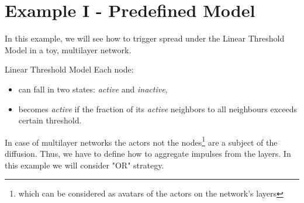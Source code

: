 \documentclass{beamer}
\begin{document}

\section{Example I - Predefined Model}

\begin{frame}{\secname}
    In this example, we will see how to trigger spread under the Linear Threshold Model in a toy,
    multilayer network.
    \begin{block}{Linear Threshold Model}
    Each node:
    \begin{itemize}
        \item can fall in two states: \textit{active} and \textit{inactive},
        \item becomes \textit{active} if the fraction of its \textit{active} neighbors to all neighbours
        exceeds certain threshold.
    \end{itemize}
    \end{block}
    In case of multilayer networks the actors not the nodes\footnote{which can be considered as avatars
    of the actors on the network's layers} are a subject of the diffusion. Thus, we have to define
    how to aggregate impulses from the layers. In this example we will consider "OR" strategy.
\end{frame}
\end{document}
